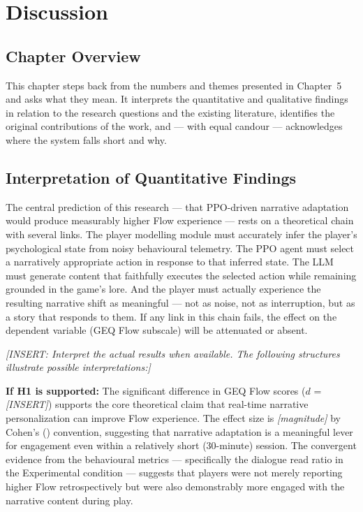 \chapter{Discussion}

\section{Chapter Overview}

This chapter steps back from the numbers and themes presented in Chapter~5 and asks what they mean. It interprets the quantitative and qualitative findings in relation to the research questions and the existing literature, identifies the original contributions of the work, and --- with equal candour --- acknowledges where the system falls short and why.

\section{Interpretation of Quantitative Findings}

The central prediction of this research --- that PPO-driven narrative adaptation would produce measurably higher Flow experience --- rests on a theoretical chain with several links. The player modelling module must accurately infer the player's psychological state from noisy behavioural telemetry. The PPO agent must select a narratively appropriate action in response to that inferred state. The LLM must generate content that faithfully executes the selected action while remaining grounded in the game's lore. And the player must actually experience the resulting narrative shift as meaningful --- not as noise, not as interruption, but as a story that responds to them. If any link in this chain fails, the effect on the dependent variable (GEQ Flow subscale) will be attenuated or absent.

\textit{[INSERT: Interpret the actual results when available. The following structures illustrate possible interpretations:]}

\textbf{If H1 is supported:} The significant difference in GEQ Flow scores ($d$ = \textit{[INSERT]}) supports the core theoretical claim that real-time narrative personalization can improve Flow experience. The effect size is \textit{[magnitude]} by Cohen's (\citeyear{cohen1988statistical}) convention, suggesting that narrative adaptation is a meaningful lever for engagement even within a relatively short (30-minute) session. The convergent evidence from the behavioural metrics --- specifically the dialogue read ratio in the Experimental condition --- suggests that players were not merely reporting higher Flow retrospectively but were also demonstrably more engaged with the narrative content during play.

